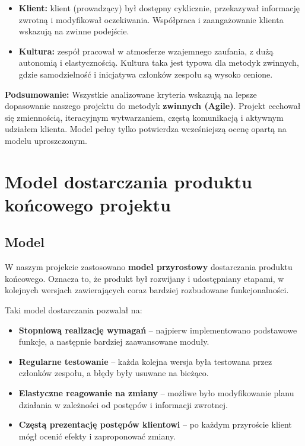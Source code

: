 \documentclass[12pt,a4paper,colorlinks=true,linkcolor=NavyBlue,citecolor=red,urlcolor=NavyBlue]{book}
\begin{document}
\begin{itemize}
  \item \textbf{Klient:} klient (prowadzący) był dostępny cyklicznie, przekazywał informację zwrotną i modyfikował oczekiwania. Współpraca i zaangażowanie klienta wskazują na zwinne podejście.
  
  \item \textbf{Kultura:} zespół pracował w atmosferze wzajemnego zaufania, z dużą autonomią i elastycznością. Kultura taka jest typowa dla metodyk zwinnych, gdzie samodzielność i inicjatywa członków zespołu są wysoko cenione.
\end{itemize}

\noindent
\textbf{Podsumowanie:} Wszystkie analizowane kryteria wskazują na lepsze dopasowanie naszego projektu do metodyk \textbf{zwinnych (Agile)}. Projekt cechował się zmiennością, iteracyjnym wytwarzaniem, częstą komunikacją i aktywnym udziałem klienta. Model pełny tylko potwierdza wcześniejszą ocenę opartą na modelu uproszczonym.


\newpage
\thispagestyle{empty}
\null
\newpage


\chapter{Model dostarczania produktu końcowego projektu}

\section{Model}

W naszym projekcie zastosowano \textbf{model przyrostowy} dostarczania produktu końcowego. Oznacza to, że produkt był rozwijany i udostępniany etapami, w kolejnych wersjach zawierających coraz bardziej rozbudowane funkcjonalności.

Taki model dostarczania pozwalał na:
\begin{itemize}
  \item \textbf{Stopniową realizację wymagań} – najpierw implementowano podstawowe funkcje, a następnie bardziej zaawansowane moduły.
  \item \textbf{Regularne testowanie} – każda kolejna wersja była testowana przez członków zespołu, a błędy były usuwane na bieżąco.
  \item \textbf{Elastyczne reagowanie na zmiany} – możliwe było modyfikowanie planu działania w zależności od postępów i informacji zwrotnej.
  \item \textbf{Częstą prezentację postępów klientowi} – po każdym przyroście klient mógł ocenić efekty i zaproponować zmiany.
\end{itemize}
\end{document}
